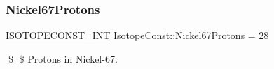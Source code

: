 \subsubsection{\texorpdfstring{Nickel67\+Protons}{Nickel67Protons}}
{\footnotesize\ttfamily \mbox{\hyperlink{group___isotope_const-_macros_ga5f18360b3e99483a35c32d789e62621c}{I\+S\+O\+T\+O\+P\+E\+C\+O\+N\+S\+T\+\_\+\+I\+NT}} Isotope\+Const\+::\+Nickel67\+Protons = 28}

\$ \$ Protons in Nickel-\/67. 